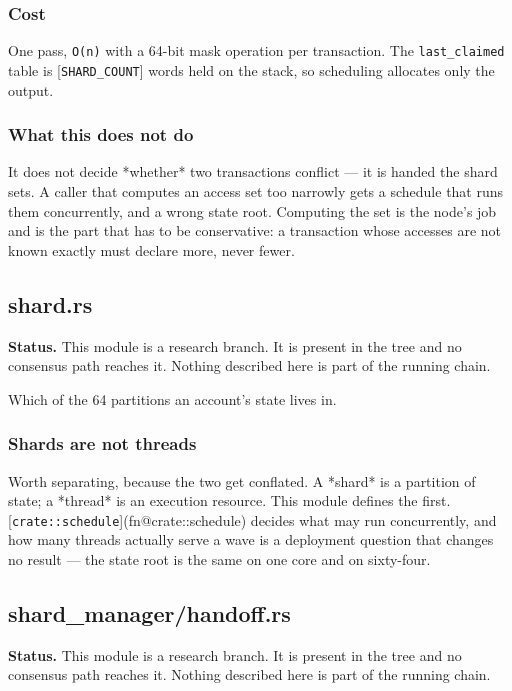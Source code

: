 \documentclass[11pt,a4paper]{article}
\begin{document}
\subsubsection{Cost}

One pass, \texttt{O(n)} with a 64-bit mask operation per transaction. The
\texttt{last\_claimed} table is [\texttt{SHARD\_COUNT}] words held on the stack, so
scheduling allocates only the output.

\subsubsection{What this does not do}

It does not decide *whether* two transactions conflict — it is handed the
shard sets. A caller that computes an access set too narrowly gets a
schedule that runs them concurrently, and a wrong state root. Computing the
set is the node's job and is the part that has to be conservative: a
transaction whose accesses are not known exactly must declare more, never
fewer.

\subsection{shard.rs}
\begin{framed}\noindent\textbf{Status.} This module is a research branch. It is present in the tree and no consensus path reaches it. Nothing described here is part of the running chain.\end{framed}

Which of the 64 partitions an account's state lives in.

\subsubsection{Shards are not threads}

Worth separating, because the two get conflated. A *shard* is a partition of
state; a *thread* is an execution resource. This module defines the first.
[\texttt{crate::schedule}](fn@crate::schedule) decides what may run concurrently, and how many threads
actually serve a wave is a deployment question that changes no result — the
state root is the same on one core and on sixty-four.

\subsection{shard\_manager/handoff.rs}
\begin{framed}\noindent\textbf{Status.} This module is a research branch. It is present in the tree and no consensus path reaches it. Nothing described here is part of the running chain.\end{framed}
\end{document}
